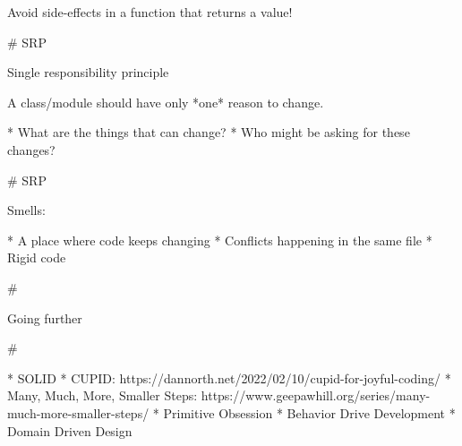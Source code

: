 \vfill

Avoid side-effects in a function that returns a value!

# SRP

Single responsibility principle

A class/module should have only *one* reason to change.

* What are the things that can change?
* Who might be asking for these changes?

# SRP

Smells:

* A place where code keeps changing
* Conflicts happening in the same file
* Rigid code

#

\huge \center Going further

#

* SOLID
* CUPID: https://dannorth.net/2022/02/10/cupid-for-joyful-coding/
* Many, Much, More, Smaller Steps: https://www.geepawhill.org/series/many-much-more-smaller-steps/
* Primitive Obsession
* Behavior Drive Development
* Domain Driven Design
